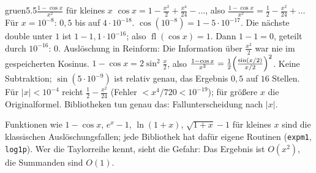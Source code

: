 \begin{loesungkarte}{gruen}{5.5}{$\frac{1 - \cos x}{x^{2}}$ für kleines $x$}
$\cos x = 1 - \frac{x^{2}}2 + \frac{x^{4}}{24} - \dots$, also $\frac{1 - \cos x}{x^{2}} = \frac12 - \frac{x^{2}}{24} + \dots$ Für $x = 10^{-8}$: $0{,}5$ bis auf $4\cdot10^{-18}$.
$\cos(10^{-8}) = 1 - 5\cdot10^{-17}$. Die nächste double unter $1$ ist $1 - 1{,}1\cdot10^{-16}$; also $\operatorname{fl}(\cos x) = 1$. Dann $1 - 1 = 0$, geteilt durch $10^{-16}$: $0$. Auslöschung in Reinform: Die Information über $\frac{x^{2}}2$ war nie im gespeicherten Kosinus.
$1 - \cos x = 2\sin^{2}\frac x2$, also $\frac{1 - \cos x}{x^{2}} = \frac12\Bigl(\frac{\sin(x/2)}{x/2}\Bigr)^{2}$. Keine Subtraktion; $\sin(5\cdot10^{-9})$ ist relativ genau, das Ergebnis $0{,}5$ auf $16$ Stellen.
Für $|x| < 10^{-4}$ reicht $\frac12 - \frac{x^{2}}{24}$ (Fehler $< x^{4}/720 < 10^{-19}$); für größere $x$ die Originalformel. Bibliotheken tun genau das: Fallunterscheidung nach $|x|$.
\begin{mitnehmen}\kastentext
Funktionen wie $1 - \cos x$, $e^{x} - 1$, $\ln(1 + x)$, $\sqrt{1 + x} - 1$ für kleines $x$ sind die klassischen Auslöschungsfallen; jede Bibliothek hat dafür eigene Routinen (\texttt{expm1}, \texttt{log1p}). Wer die Taylorreihe kennt, sieht die Gefahr: Das Ergebnis ist $O(x^{2})$, die Summanden sind $O(1)$.
\end{mitnehmen}
\end{loesungkarte}

